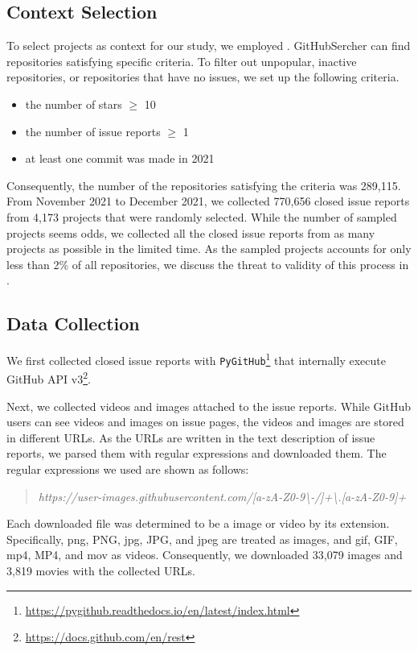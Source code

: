 \subsection{Context Selection}
To select projects as context for our study, we employed . GitHubSercher can find repositories satisfying specific criteria. To filter out unpopular, inactive repositories, or repositories that have no issues, we set up the following criteria.
\begin{itemize}
	\item the number of stars $\geq$ 10
	\item the number of issue reports $\geq$ 1
	\item at least one commit was made in 2021
\end{itemize}
Consequently, the number of the repositories satisfying the criteria was 289,115. From November 2021 to December 2021, we collected 770,656 closed issue reports from 4,173 projects that were randomly selected. While the number of sampled projects seems odds, we collected all the closed issue reports from as many projects as possible in the limited time.  
As the sampled projects accounts for only less than 2\% of all repositories, we discuss the threat to validity of this process in . 


% 

\subsection{Data Collection}
We first collected closed issue reports with \texttt{PyGitHub}\footnote{\url{https://pygithub.readthedocs.io/en/latest/index.html}} that internally execute GitHub API v3\footnote{\url{https://docs.github.com/en/rest}}. 

Next, we collected videos and images attached to the issue reports. While GitHub users can see videos and images on issue pages, the videos and images are stored in different URLs. As the URLs are written in the text description of issue reports, we parsed them with regular expressions and downloaded them. The regular expressions we used are shown as follows:
\begin{quote}
\addtolength\leftmargini{0in}
{\it https://user-images.githubusercontent.com/[a-zA-Z0-9\textbackslash-/]+\textbackslash.[a-zA-Z0-9]+}
\end{quote}
Each downloaded file was determined to be a image or video by its extension. Specifically, png, PNG, jpg, JPG, and jpeg are treated as images, and  gif, GIF, mp4, MP4, and mov as videos.
Consequently, we downloaded 33,079 images and 3,819 movies
with the collected URLs. 

